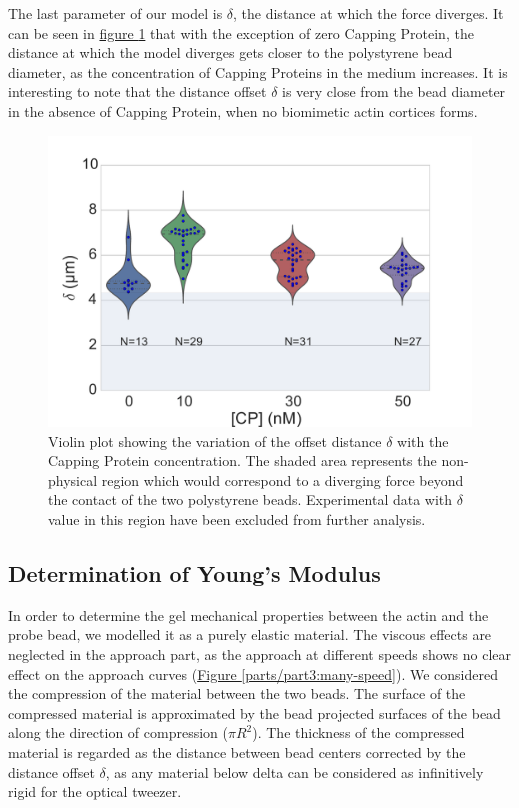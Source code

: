 \documentclass[A4paperpaper,11pt,english]{sphinxmanual}
\begin{document}
The last parameter of our model is \(\delta\), the distance at which the force
diverges.   It can be seen in \hyperref[parts/part3:delta-violin]{figure  \ref*{parts/part3:delta-violin}} that with the exception
of zero Capping Protein, the distance at which the model diverges gets
closer to the polystyrene bead diameter, as the concentration of Capping
Proteins in the medium increases. It is interesting to note that the distance offset
\(\delta\) is very close from the bead diameter in the absence of Capping Protein, when no
biomimetic actin cortices forms.
\begin{figure}[htbp]
\centering
\capstart

\includegraphics[width=0.800\linewidth]{delta_violin.pdf}
\caption{Violin plot showing the variation of the offset distance \(\delta\)
with the Capping Protein concentration. The shaded area represents the
non-physical region which would correspond to a diverging force beyond the
contact of the two polystyrene beads. Experimental data with \(\delta\)
value in this region have been excluded from further analysis.}\label{parts/part3:delta-violin}\end{figure}


\subsection{Determination of Young's Modulus}
\label{parts/part3:determination-of-young-s-modulus}
In order to determine the gel mechanical properties between the actin and the
probe bead, we modelled it as a purely elastic material. The viscous effects are
neglected in the approach part, as the approach at different speeds shows no
clear effect on the approach curves (\hyperref[parts/part3:many-speed]{Figure  \ref*{parts/part3:many-speed}}). We considered
the compression of the material between the two beads. The surface of the
compressed material is approximated by the bead projected surfaces of the bead along the
direction of compression (\(\pi R^2\)).  The thickness of the compressed
material is regarded as the distance between bead centers corrected by the
distance offset \(\delta\), as any material below delta can be considered as
infinitively rigid for the optical tweezer.
\end{document}
